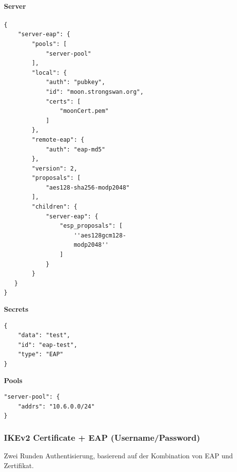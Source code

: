 \begin{minipage}[t]{0.5\textwidth}
\vspace{0pt}
\paragraph{Server}\mbox{}\medskip
\begin{lstlisting}[style=BashInputStyle]
{
    "server-eap": {
        "pools": [
            "server-pool"
        ],
        "local": {
            "auth": "pubkey",
            "id": "moon.strongswan.org",
            "certs": [
                "moonCert.pem"
            ]
        },
        "remote-eap": {
            "auth": "eap-md5"
        },
        "version": 2,
        "proposals": [
            "aes128-sha256-modp2048"
        ],
        "children": {
            "server-eap": {
                "esp_proposals": [
                    ''aes128gcm128-
                    modp2048''
                ]
            }
        }
   }
}
\end{lstlisting}
\hspace*{18pt}\textbf{Secrets}\mbox{}\medskip
\begin{lstlisting}[style=BashInputStyle]
{
    "data": "test",
    "id": "eap-test",
    "type": "EAP"
}
\end{lstlisting}
\hspace*{18pt}\textbf{Pools}\mbox{}\medskip
\begin{lstlisting}[style=BashInputStyle]
"server-pool": {
    "addrs": "10.6.0.0/24"
}
\end{lstlisting}
\end{minipage}





\subsubsection{IKEv2 Certificate + EAP (Username/Password)}
Zwei Runden Authentisierung, basierend auf der Kombination von EAP und Zertifikat.\\

